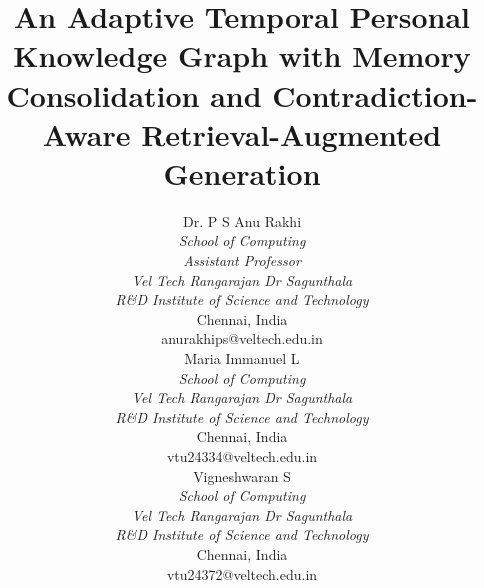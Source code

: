 \documentclass[conference]{IEEEtran}
\begin{document}
\title{An Adaptive Temporal Personal Knowledge Graph with Memory Consolidation and Contradiction-Aware Retrieval-Augmented Generation}

\author{%
\begin{minipage}[t]{0.31\linewidth}\centering
\normalsize Dr. P S Anu Rakhi\\
\small\textit{School of Computing}\\
\textit{Assistant Professor}\\
\textit{Vel Tech Rangarajan Dr Sagunthala}\\
\textit{R\&D Institute of Science and Technology}\\
Chennai, India\\
anurakhips@veltech.edu.in
\end{minipage}\hfill
\begin{minipage}[t]{0.31\linewidth}\centering
\normalsize Maria Immanuel L\\
\small\textit{School of Computing}\\
\textit{Vel Tech Rangarajan Dr Sagunthala}\\
\textit{R\&D Institute of Science and Technology}\\
Chennai, India\\
vtu24334@veltech.edu.in
\end{minipage}\hfill
\begin{minipage}[t]{0.31\linewidth}\centering
\normalsize Vigneshwaran S\\
\small\textit{School of Computing}\\
\textit{Vel Tech Rangarajan Dr Sagunthala}\\
\textit{R\&D Institute of Science and Technology}\\
Chennai, India\\
vtu24372@veltech.edu.in
\end{minipage}%
}

\maketitle
\end{document}
